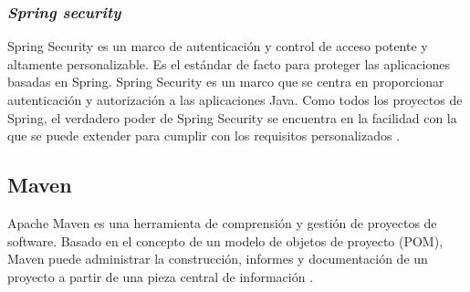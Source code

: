 \begin{spacing}{1.5}
		\subsubsection{\textit{Spring security}}
			Spring Security es un marco de autenticación y control de acceso potente y altamente personalizable. Es el estándar de facto para proteger las aplicaciones basadas en Spring.
			Spring Security es un marco que se centra en proporcionar autenticación y autorización a las aplicaciones Java. Como todos los proyectos de Spring, el verdadero poder de Spring Security se encuentra en la facilidad con la que se puede extender para cumplir con los requisitos personalizados \cite{chap2_spring_security}.
	\subsection{Maven}
		Apache Maven es una herramienta de comprensión y gestión de proyectos de software. Basado en el concepto de un modelo de objetos de proyecto (POM), Maven puede administrar la construcción, informes y documentación de un proyecto a partir de una pieza central de información \cite{chap2_maven}.
	\clearpage

\end{spacing}

